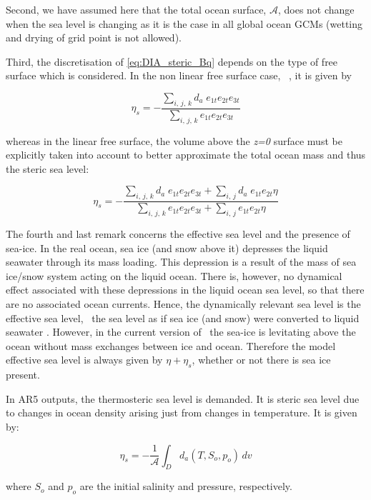 \documentclass[../main/NEMO_manual]{subfiles}
\begin{document}
Second, we have assumed here that the total ocean surface, $\mathcal{A}$,
does not change when the sea level is changing as it is the case in all global ocean GCMs
(wetting and drying of grid point is not allowed).

Third, the discretisation of \autoref{eq:DIA_steric_Bq} depends on the type of free surface which is considered.
In the non linear free surface case, \ie\ , it is given by

\[
  \eta_s = - \frac{ \sum_{i,\,j,\,k} d_a\; e_{1t} e_{2t} e_{3t} }{ \sum_{i,\,j,\,k}       e_{1t} e_{2t} e_{3t} }
\]

whereas in the linear free surface,
the volume above the \textit{z=0} surface must be explicitly taken into account to
better approximate the total ocean mass and thus the steric sea level:

\[
  \eta_s = - \frac{ \sum_{i,\,j,\,k} d_a\; e_{1t}e_{2t}e_{3t} + \sum_{i,\,j} d_a\; e_{1t}e_{2t} \eta }
                  { \sum_{i,\,j,\,k}       e_{1t}e_{2t}e_{3t} + \sum_{i,\,j}       e_{1t}e_{2t} \eta }
\]

The fourth and last remark concerns the effective sea level and the presence of sea-ice.
In the real ocean, sea ice (and snow above it)  depresses the liquid seawater through its mass loading.
This depression is a result of the mass of sea ice/snow system acting on the liquid ocean.
There is, however, no dynamical effect associated with these depressions in the liquid ocean sea level,
so that there are no associated ocean currents.
Hence, the dynamically relevant sea level is the effective sea level,
\ie\ the sea level as if sea ice (and snow) were converted to liquid seawater \citep{campin.marshall.ea_OM08}.
However, in the current version of \NEMO\ the sea-ice is levitating above the ocean without mass exchanges between
ice and ocean.
Therefore the model effective sea level is always given by $\eta + \eta_s$, whether or not there is sea ice present.

In AR5 outputs, the thermosteric sea level is demanded.
It is steric sea level due to changes in ocean density arising just from changes in temperature.
It is given by:

\[
  \eta_s = - \frac{1}{\mathcal{A}} \int_D d_a(T,S_o,p_o) \,dv
\]

where $S_o$ and $p_o$ are the initial salinity and pressure, respectively.
\end{document}
